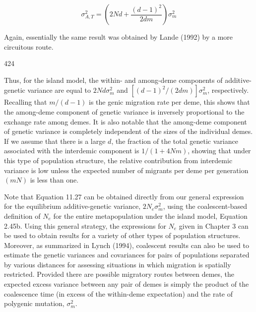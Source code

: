 \documentclass{article}
\begin{document}
\begin{equation}
\sigma_{A,T}^{2}=\left(2N d+\frac{(d-1)^{2}}{2d m}\right)\sigma_{m}^{2}
\tag{11.27}
\label{eq:11_27}
\end{equation}

Again, essentially the same result was obtained by Lande (1992) by a more circuitous route.

424

Thus, for the island model, the within- and among-deme components of additive-genetic variance are equal to  $ 2N d\sigma_m^2 $ and  $ [(d - 1)^2/(2dm)]\sigma_m^2 $, respectively. Recalling that  $ m/(d - 1) $ is the genic migration rate per deme, this shows that the among-deme component of genetic variance is inversely proportional to the exchange rate among demes. It is also notable that the among-deme component of genetic variance is completely independent of the sizes of the individual demes. If we assume that there is a large  $ d $, the fraction of the total genetic variance associated with the interdemic component is  $ 1/(1 + 4Nm) $, showing that under this type of population structure, the relative contribution from interdemic variance is low unless the expected number of migrants per deme per generation  $ (mN) $ is less than one.

Note that Equation 11.27 can be obtained directly from our general expression for the equilibrium additive-genetic variance,  $ 2N_{e}\sigma_{m}^{2} $, using the coalescent-based definition of  $ N_{e} $ for the entire metapopulation under the island model, Equation 2.45b. Using this general strategy, the expressions for  $ N_{e} $ given in Chapter 3 can be used to obtain results for a variety of other types of population structures. Moreover, as summarized in Lynch (1994), coalescent results can also be used to estimate the genetic variances and covariances for pairs of populations separated by various distances for assessing situations in which migration is spatially restricted. Provided there are possible migratory routes between demes, the expected excess variance between any pair of demes is simply the product of the coalescence time (in excess of the within-deme expectation) and the rate of polygenic mutation,  $ \sigma_{m}^{2} $.
\end{document}
